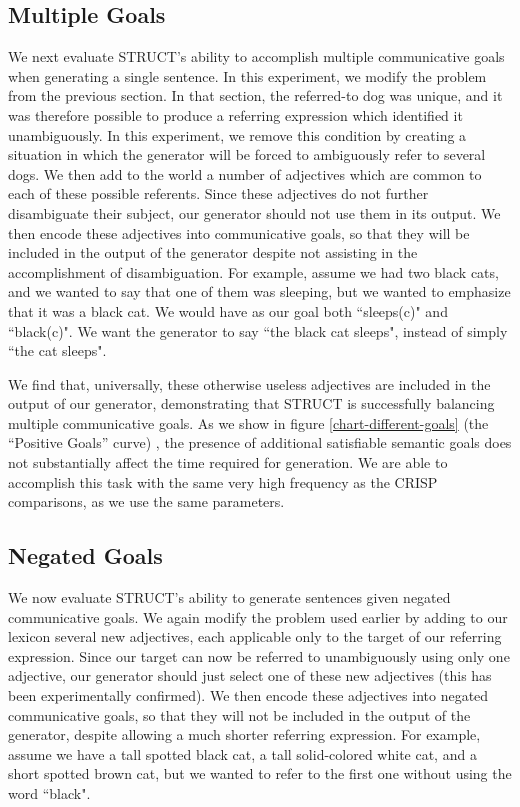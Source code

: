\subsection{Multiple Goals}
We next evaluate STRUCT's ability to accomplish
multiple communicative goals when generating a single sentence.  In this
experiment, we modify the problem from the 
previous section.  In that section, the referred-to dog was unique,
and it was therefore possible to produce a referring expression which
identified it unambiguously.  In this experiment, we remove this
condition by creating a situation in which the generator will be
forced to ambiguously refer to several dogs.  We then add to the
world a number of adjectives which are common to each of these
possible referents.  Since these adjectives do not further
disambiguate their subject, our generator should not use
them in its output.  We then encode these adjectives into
communicative goals, so that they will be included in the output of
the generator despite not assisting in the accomplishment of
disambiguation.  For example, assume we had two black cats, and
we wanted to say that one of them was sleeping, but we wanted
to emphasize that it was a black cat.  We would have as our goal
both ``sleeps(c)" and ``black(c)".  We want the generator to
say ``the black cat sleeps", instead of simply ``the cat sleeps".

We find that, universally, these otherwise useless
adjectives are included in the output of our generator, demonstrating
that STRUCT is successfully balancing multiple communicative goals.
As we show in figure \ref{chart-different-goals} (the ``Positive
Goals'' curve) , the presence of additional satisfiable semantic goals does
not substantially affect the time required for generation.  We are able to
accomplish this task with the same very high frequency as the CRISP
comparisons, as we use the same parameters.

\subsection{Negated Goals}
We now evaluate STRUCT's ability to generate
sentences given negated communicative goals.  We again modify
the problem used earlier by 
adding to our lexicon several new adjectives, each applicable only to
the target of our referring expression.  Since our target can now be
referred to unambiguously using only one adjective, our generator
should just select one of these new adjectives (this has been experimentally confirmed).
We then encode these
adjectives into negated communicative goals, so that they will not be
included in the output of the generator, despite allowing a much
shorter referring expression.  For example, assume we have a
tall spotted black cat, a tall solid-colored white cat, and a short spotted
brown cat, but we wanted to refer to the first one without
using the word ``black".

